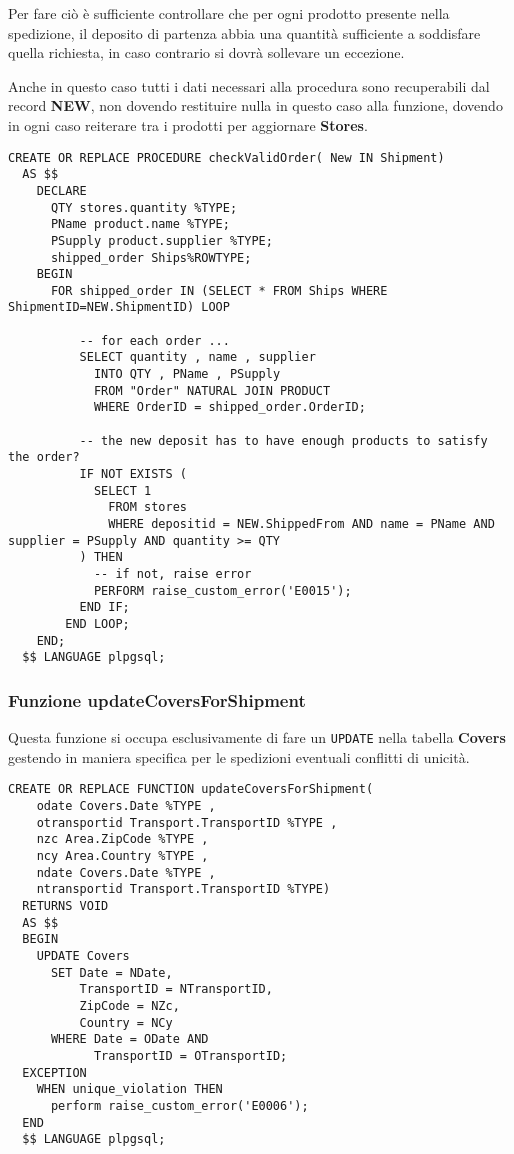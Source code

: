 Per fare ciò è sufficiente controllare che per ogni prodotto presente nella spedizione, il deposito di partenza abbia una quantità sufficiente a soddisfare quella richiesta, in caso contrario si dovrà sollevare un eccezione.

Anche in questo caso tutti i dati necessari alla procedura sono recuperabili dal record \textbf{NEW}, non dovendo restituire nulla in questo caso alla funzione, dovendo in ogni caso reiterare tra i prodotti per aggiornare \textbf{Stores}.

\begin{lstlisting}[caption={Procedure \textbf{checkValidOrder}}]
  CREATE OR REPLACE PROCEDURE checkValidOrder( New IN Shipment)
  AS $$
    DECLARE
      QTY stores.quantity %TYPE;
      PName product.name %TYPE;
      PSupply product.supplier %TYPE;
      shipped_order Ships%ROWTYPE;
    BEGIN
      FOR shipped_order IN (SELECT * FROM Ships WHERE ShipmentID=NEW.ShipmentID) LOOP
  
          -- for each order ...
          SELECT quantity , name , supplier 
            INTO QTY , PName , PSupply
            FROM "Order" NATURAL JOIN PRODUCT
            WHERE OrderID = shipped_order.OrderID;
  
          -- the new deposit has to have enough products to satisfy the order?
          IF NOT EXISTS (
            SELECT 1
              FROM stores
              WHERE depositid = NEW.ShippedFrom AND name = PName AND supplier = PSupply AND quantity >= QTY
          ) THEN
            -- if not, raise error
            PERFORM raise_custom_error('E0015');
          END IF;
        END LOOP;
    END;
  $$ LANGUAGE plpgsql;
\end{lstlisting}

\newpage

\subsubsection{Funzione \textbf{updateCoversForShipment}}

Questa funzione si occupa esclusivamente di fare un \lstinline{UPDATE} nella tabella \textbf{Covers} gestendo in maniera specifica per le spedizioni eventuali conflitti di unicità.

\begin{lstlisting}[caption={Funzione \textbf{updateCoversForShipment}}, label={updateCoversForShipment}]
  CREATE OR REPLACE FUNCTION updateCoversForShipment(
    odate Covers.Date %TYPE , 
    otransportid Transport.TransportID %TYPE , 
    nzc Area.ZipCode %TYPE , 
    ncy Area.Country %TYPE , 
    ndate Covers.Date %TYPE , 
    ntransportid Transport.TransportID %TYPE)
  RETURNS VOID 
  AS $$
  BEGIN
    UPDATE Covers 
      SET Date = NDate,
          TransportID = NTransportID,
          ZipCode = NZc,
          Country = NCy
      WHERE Date = ODate AND 
            TransportID = OTransportID;
  EXCEPTION
    WHEN unique_violation THEN 
      perform raise_custom_error('E0006');
  END
  $$ LANGUAGE plpgsql;
\end{lstlisting}

